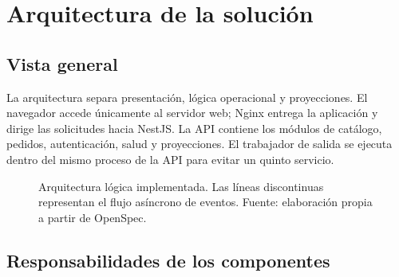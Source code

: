 \chapter{Arquitectura de la solución}
\label{chap:arquitectura}

\section{Vista general}

La arquitectura separa presentación, lógica operacional y proyecciones. El navegador accede únicamente al servidor web; Nginx entrega la aplicación y dirige las solicitudes  hacia NestJS. La API contiene los módulos de catálogo, pedidos, autenticación, salud y proyecciones. El trabajador de salida se ejecuta dentro del mismo proceso de la API para evitar un quinto servicio.

\begin{figure}[H]
  \centering
  \caption{Arquitectura lógica implementada. Las líneas discontinuas representan el flujo asíncrono de eventos. Fuente: elaboración propia a partir de OpenSpec.}
  \label{fig:arquitectura}
\end{figure}

\section{Responsabilidades de los componentes}

